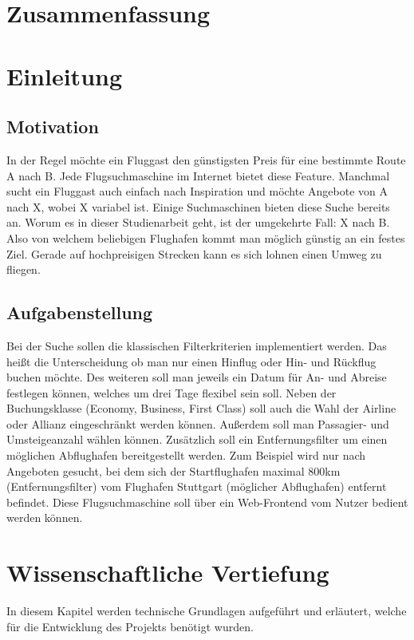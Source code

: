 \documentclass[12pt,twoside,a4paper]{article}
\begin{document}
\section*{Zusammenfassung}
\newpage
\tableofcontents
\newpage
\listoffigures
\newpage
\printglossary[type=\acronymtype]
\printglossary
\newpage
{}
\setcounter{page}{1}
\section{Einleitung}
\subsection{Motivation}
In der Regel möchte ein Fluggast den günstigsten Preis für eine bestimmte Route A nach B. Jede Flugsuchmaschine im Internet bietet diese Feature. Manchmal sucht ein Fluggast auch einfach nach Inspiration und möchte Angebote von A nach X, wobei X variabel ist. Einige Suchmaschinen bieten diese Suche bereits an. Worum es in dieser Studienarbeit geht, ist der umgekehrte Fall: X nach B. Also von welchem beliebigen Flughafen kommt man möglich günstig an ein festes Ziel.\newline
Gerade auf hochpreisigen Strecken kann es sich lohnen einen Umweg zu fliegen.
\subsection{Aufgabenstellung}
Bei der Suche sollen die klassischen Filterkriterien implementiert werden. Das heißt die Unterscheidung ob man nur einen Hinflug oder Hin- und Rückflug buchen möchte. Des weiteren soll man jeweils ein Datum für An- und Abreise festlegen können, welches um drei Tage flexibel sein soll. Neben der Buchungsklasse (Economy, Business, First Class) soll auch die Wahl der Airline oder Allianz eingeschränkt werden können. Außerdem soll man Passagier- und Umsteigeanzahl wählen können.\newline
Zusätzlich soll ein Entfernungsfilter um einen möglichen Abflughafen bereitgestellt werden. Zum Beispiel wird nur nach Angeboten gesucht, bei dem sich der Startflughafen maximal 800km (Entfernungsfilter) vom Flughafen Stuttgart (möglicher Abflughafen) entfernt befindet.\newline
Diese Flugsuchmaschine soll über ein Web-Frontend vom Nutzer bedient werden können.
\newpage
\section{Wissenschaftliche Vertiefung}
In diesem Kapitel werden technische Grundlagen aufgeführt und erläutert, welche für die Entwicklung des Projekts benötigt wurden.
\end{document}
